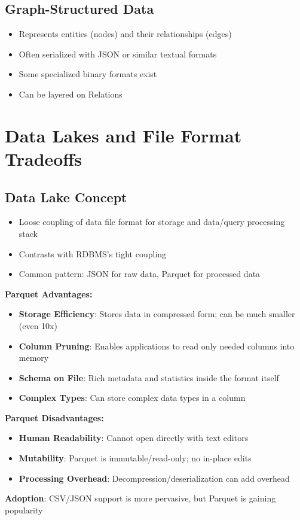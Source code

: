 \documentclass[12pt]{article}
\begin{document}
\subsection{Graph-Structured Data}
\begin{itemize}
    \item Represents entities (nodes) and their relationships (edges)
    \item Often serialized with JSON or similar textual formats
    \item Some specialized binary formats exist
    \item Can be layered on Relations
\end{itemize}

\section{Data Lakes and File Format Tradeoffs}

\subsection{Data Lake Concept}
\begin{itemize}
    \item Loose coupling of data file format for storage and data/query processing stack
    \item Contrasts with RDBMS's tight coupling
    \item Common pattern: JSON for raw data, Parquet for processed data
\end{itemize}

\begin{tcolorbox}[colback=green!5!white,colframe=green!75!black,title=Parquet vs. Text-Based Files Tradeoffs]
\textbf{Parquet Advantages:}
\begin{itemize}
    \item \textbf{Storage Efficiency}: Stores data in compressed form; can be much smaller (even 10x)
    \item \textbf{Column Pruning}: Enables applications to read only needed columns into memory
    \item \textbf{Schema on File}: Rich metadata and statistics inside the format itself
    \item \textbf{Complex Types}: Can store complex data types in a column
\end{itemize}

\textbf{Parquet Disadvantages:}
\begin{itemize}
    \item \textbf{Human Readability}: Cannot open directly with text editors
    \item \textbf{Mutability}: Parquet is immutable/read-only; no in-place edits
    \item \textbf{Processing Overhead}: Decompression/deserialization can add overhead
\end{itemize}

\textbf{Adoption}: CSV/JSON support is more pervasive, but Parquet is gaining popularity
\end{tcolorbox}
\end{document}
